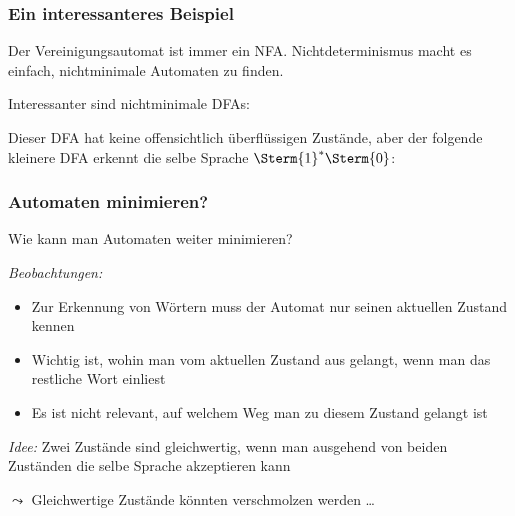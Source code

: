 \documentclass[aspectratio=1610,onlymath]{beamer}
\begin{document}
\begin{frame}\frametitle{Ein interessanteres Beispiel}

Der Vereinigungsautomat ist immer ein NFA. Nichtdeterminismus macht es einfach, nichtminimale Automaten zu finden.
\medskip

Interessanter sind nichtminimale DFAs:\medskip

\pause

Dieser DFA hat keine offensichtlich überflüssigen Zustände, aber der folgende kleinere DFA erkennt die selbe Sprache $\Sterm{1}^*\Sterm{0}$:\medskip


\end{frame}

\begin{frame}\frametitle{Automaten minimieren?}

\alert{Wie kann man Automaten weiter minimieren?}
\bigskip

\emph{Beobachtungen:}
\begin{itemize}
\item Zur Erkennung von Wörtern muss der Automat nur seinen aktuellen Zustand kennen
\item Wichtig ist, wohin man vom aktuellen Zustand aus gelangt, wenn man das restliche Wort einliest
\item Es ist nicht relevant, auf welchem Weg man zu diesem Zustand gelangt ist
\end{itemize}\medskip\pause

\emph{Idee:} Zwei Zustände sind gleichwertig, wenn man ausgehend von beiden Zuständen die selbe Sprache akzeptieren kann
\bigskip

$\leadsto$ Gleichwertige Zustände könnten verschmolzen werden \ldots

\end{frame}
\end{document}
